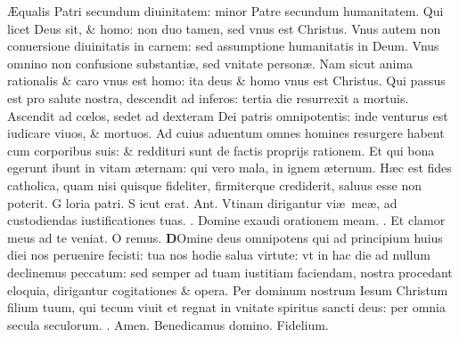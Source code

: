\documentclass[a5paper,10pt]{book}
\makeatletter
\DeclareRobustCommand{\Vbar}{\vers@resp{-0.1em}{V}}
\DeclareRobustCommand{\Rbar}{\vers@resp{0pt}{R}}
\newcommand{\vers@resp@sym}{\raisebox{0.2ex}{\rotatebox[origin=c]{-20}{$\m@th\rceil$}}}
\newcommand{\vers@resp}[2]{%
  {\ooalign{\hidewidth\kern#1\vers@resp@sym\hidewidth\cr#2\cr}}%
}%
\def\ae{æ}
\def\AE{Æ}
\def\oe{œ}
\makeatother
\begin{document}
\begin{multicols*}{2}
\newline \color{red} \AE \color{black}qualis Patri secundum diuinitatem: minor Patre secundum humanitatem.
\newline \color{red} Q\color{black}ui licet Deus sit, \& homo: non duo tamen, sed vnus est Christus.
\newline \color{red} V\color{black}nus autem non conuersione diuinitatis in carnem: sed assumptione humanitatis in Deum.
\newline \color{red} V\color{black}nus omnino non confusione substanti\ae , sed vnitate person\ae .
\newline \color{red} N\color{black}am sicut anima rationalis \& caro vnus est homo: ita deus \& homo vnus est Christus.
\newline \color{red} Q\color{black}ui passus est pro salute nostra, descendit ad inferos: tertia die resurrexit a mortuis.
\newline \color{red} A\color{black}scendit ad c\oe los, sedet ad dexteram Dei patris omnipotentis: inde venturus est iudicare viuos, \& mortuos.
\newline \color{red} A\color{black}d cuius aduentum omnes homines resurgere habent cum corporibus suis: \& reddituri sunt de factis proprijs rationem.
\newline \color{red} E\color{black}t qui bona egerunt ibunt in vitam \ae ternam: qui vero mala, in ignem \ae ternum.
\newline \color{red} H\color{black}\ae c est fides catholica, quam nisi quisque fideliter, firmiterque crediderit, saluus esse non poterit.
\newline \color{red} G\color{black} loria patri. \color{red} S\color{black} icut erat. \color{red} Ant. \color{black} Vtinam dirigantur vi\ae \ me\ae , ad custodiendas iustificationes tuas. \color{red} \Vbar . \color{black} Domine exaudi orationem meam. \color{red} \Rbar . \color{black} Et clamor meus ad te veniat. \quad \color{red} O\color{black} remus.
\lettrine[lines=2]{\bfseries \color{red} D}{}Omine deus omnipotens qui ad principium huius diei nos peruenire fecisti: tua nos hodie salua virtute: vt in hac die ad nullum declinemus peccatum: sed semper ad tuam iustitiam faciendam, nostra procedant eloquia, dirigantur cogitationes \& opera. Per dominum nostrum Iesum Christum filium tuum, qui tecum viuit et regnat in vnitate spiritus sancti deus: per omnia secula seculorum. \color{red} \Rbar . \color{black} Amen. Benedicamus domino. Fidelium.
\vspace{-1em}

\end{multicols*}
\end{document}
